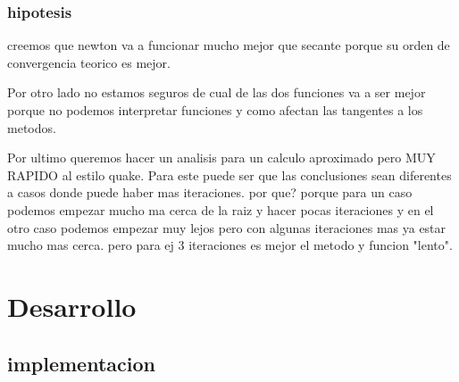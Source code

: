 \documentclass[10pt,a4paper]{article} \usepackage[utf8]{inputenc} %
\begin{document}
\subsubsection{hipotesis}
creemos que newton va a funcionar mucho mejor que secante porque su orden de
convergencia teorico es mejor.

Por otro lado no estamos seguros de cual de las dos funciones va a ser mejor
porque no podemos interpretar funciones y como afectan las tangentes a los
metodos.

Por ultimo queremos hacer un analisis para un calculo aproximado pero MUY
RAPIDO al estilo quake. Para este puede ser que las conclusiones sean
diferentes a casos donde puede haber mas iteraciones.  por que? porque para un
caso podemos empezar mucho ma cerca de la raiz y hacer pocas iteraciones y en
el otro caso podemos empezar muy lejos pero con algunas iteraciones mas ya
estar mucho mas cerca. pero para ej 3 iteraciones es mejor el metodo y funcion
"lento".



\newpage \section{Desarrollo}

\subsection{implementacion}
\end{document}
